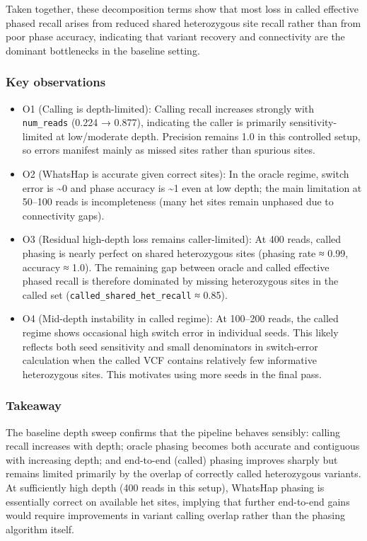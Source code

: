 \documentclass[
]{article}
\providecommand{\tightlist}{%
  \setlength{\itemsep}{0pt}\setlength{\parskip}{0pt}}
\begin{document}
Taken together, these decomposition terms show that most loss in called
effective phased recall arises from reduced shared heterozygous site
recall rather than from poor phase accuracy, indicating that variant
recovery and connectivity are the dominant bottlenecks in the baseline
setting.

\subsubsection{Key observations}\label{key-observations}

\begin{itemize}
\tightlist
\item
  O1 (Calling is depth-limited): Calling recall increases strongly with
  \texttt{num\_reads} (0.224 → 0.877), indicating the caller is
  primarily sensitivity-limited at low/moderate depth. Precision remains
  1.0 in this controlled setup, so errors manifest mainly as missed
  sites rather than spurious sites.
\item
  O2 (WhatsHap is accurate given correct sites): In the oracle regime,
  switch error is \textasciitilde0 and phase accuracy is
  \textasciitilde1 even at low depth; the main limitation at 50--100
  reads is incompleteness (many het sites remain unphased due to
  connectivity gaps).
\item
  O3 (Residual high-depth loss remains caller-limited): At 400 reads,
  called phasing is nearly perfect on shared heterozygous sites (phasing
  rate ≈ 0.99, accuracy ≈ 1.0). The remaining gap between oracle and
  called effective phased recall is therefore dominated by missing
  heterozygous sites in the called set
  (\texttt{called\_shared\_het\_recall} ≈ 0.85).
\item
  O4 (Mid-depth instability in called regime): At 100--200 reads, the
  called regime shows occasional high switch error in individual seeds.
  This likely reflects both seed sensitivity and small denominators in
  switch-error calculation when the called VCF contains relatively few
  informative heterozygous sites. This motivates using more seeds in the
  final pass.
\end{itemize}

\subsubsection{Takeaway}\label{takeaway}

The baseline depth sweep confirms that the pipeline behaves sensibly:
calling recall increases with depth; oracle phasing becomes both
accurate and contiguous with increasing depth; and end-to-end (called)
phasing improves sharply but remains limited primarily by the overlap of
correctly called heterozygous variants. At sufficiently high depth (400
reads in this setup), WhatsHap phasing is essentially correct on
available het sites, implying that further end-to-end gains would
require improvements in variant calling overlap rather than the phasing
algorithm itself.
\end{document}
